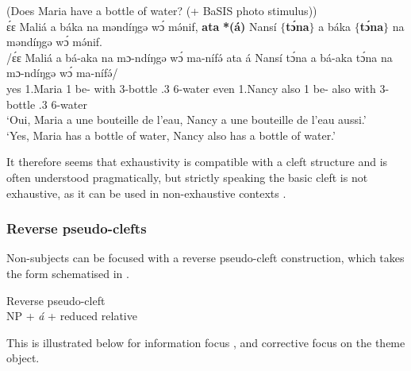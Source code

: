 \documentclass[output=paper,colorlinks,citecolor=brown
]{langscibook}
\begin{document}
\ea
\label{exhevenNancy}
(Does Maria have a bottle of water? (+ BaSIS photo stimulus)) \\
\glll
{\db}ɛ́ɛ Maliá a báka na məndíŋgə wɔ́ mə́nif, \textbf{ata} \textbf{*(á)} Nansí $\{$\textbf{tɔ́na}$\}$ a báka $\{$\textbf{tɔ́na}$\}$ na məndíŋgə wɔ́ mə́nif. \\
/ɛ́ɛ Maliá a bá-aka na mɔ-ndíŋgə wɔ́ ma-nífə́ ata á Nansí tɔ́na a bá-aka tɔ́na na mɔ-ndíŋgə wɔ́ ma-nífə́/ \\
{\db}yes 1.Maria 1\SM{} be-\DUR{} with 3-bottle \ASS{}.3 6-water even \COP{} 1.Nancy also 1\SM{} be-\DUR{} also with 3-bottle \ASS{}.3 6-water \\
\glt
`Oui, Maria a une bouteille de l'eau, Nancy a une bouteille de l'eau aussi.' \\ `Yes, Maria has a bottle of water, Nancy also has a bottle of water.' \jambox*{[JO 2347] }

\z

It therefore seems that exhaustivity is compatible with a cleft structure and is often understood pragmatically, but strictly speaking the basic cleft is not exhaustive, as it can be used in non-exhaustive contexts .


\subsubsection{Reverse pseudo-clefts} \label{subsec:revpseudo}
Non-subjects can be focused with a reverse pseudo-cleft construction, which takes the form schematised in .

\ea \label{reversepseudocleftform}
Reverse pseudo-cleft \\
NP\textsubscript{\FOC{}} + \textit{á} + reduced relative
\z

This is illustrated below for information focus ,  and corrective focus  on the theme object.%
\largerpage[-1]\pagebreak
\end{document}
